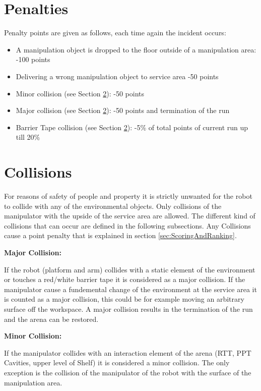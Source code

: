 \section{Penalties}
\label{sec:penalties}
Penalty points are given as follows, each time again the incident occurs:

\begin{itemize}
	\item A manipulation object is dropped to the floor outside of a manipulation area: \hfill -100 points
	\item Delivering a wrong manipulation object to service area \hfill -50 points
	\item Minor collision (see Section \ref{sec:Collisions}): \hfill -50 points
	\item Major collision (see Section \ref{sec:Collisions}): \hfill -50 points and termination of the run
  \item Barrier Tape collision (see Section \ref{sec:Collisions}): \hfill -5\% of total points of current run up till
  20\%
\end{itemize}


\section{Collisions}\label{sec:Collisions}

For reasons of safety of people and property it is strictly unwanted for the robot to collide
with any of the environmental objects. Only collisions of the manipulator with the upside of
the service area are allowed. The different kind of collisions that can occur are defined in the
following subsections. Any Collisions cause a point penalty that is explained in section \ref{sec:ScoringAndRanking}.  

\textbf{Major Collision:}

If the robot (platform and arm) collides with a static element of the environment or touches a red/white barrier tape it is considered as a major collision. If the manipulator cause a fundemental change of the environment at the service area it is counted as a major collision, this could be for example moving an arbitrary surface off the workspace. A major collision results in the termination of the run and the arena can be restored. 


\textbf{Minor Collision:}

If the manipulator collides with an interaction element of the arena (RTT, PPT Cavities, upper level
of Shelf) it is considered a minor collision. The only exception is the collision of the manipulator
of the robot with the surface of the manipulation area.

